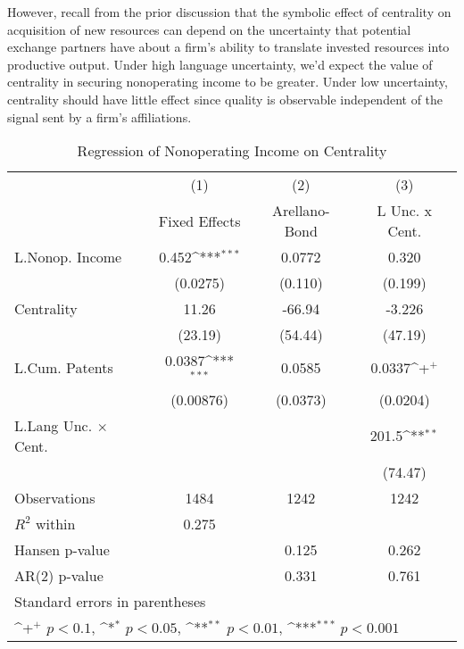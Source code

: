 However, recall from the prior discussion that the symbolic effect of centrality on acquisition of new resources can depend on the uncertainty that potential exchange partners have about a firm's ability to translate invested resources into productive output. Under high language uncertainty, we'd expect the value of centrality in securing nonoperating income to be greater. Under low uncertainty, centrality should have little effect since quality is observable independent of the signal sent by a firm's affiliations. 

\begin{table}[htbp]\centering \caption{Regression of Nonoperating Income on Centrality\label{r3}}
{
\def\sym#1{\ifmmode^{#1}\else\(^{#1}\)\fi}
\begin{tabular}{l*{3}{c}}
\hline\hline
                    &\multicolumn{1}{c}{(1)}&\multicolumn{1}{c}{(2)}&\multicolumn{1}{c}{(3)}\\
                    &\multicolumn{1}{c}{Fixed Effects}&\multicolumn{1}{c}{Arellano-Bond}&\multicolumn{1}{c}{L Unc. x Cent.}\\
\hline
L.Nonop. Income     &       0.452\sym{***}&      0.0772         &       0.320         \\
                    &    (0.0275)         &     (0.110)         &     (0.199)         \\
Centrality          &       11.26         &      -66.94         &      -3.226         \\
                    &     (23.19)         &     (54.44)         &     (47.19)         \\
L.Cum. Patents      &      0.0387\sym{***}&      0.0585         &      0.0337\sym{+}  \\
                    &   (0.00876)         &    (0.0373)         &    (0.0204)         \\
L.Lang Unc. $\times$ Cent.&                     &                     &       201.5\sym{**} \\
                    &                     &                     &     (74.47)         \\
\hline
Observations        &        1484         &        1242         &        1242         \\
$R^2$ within                &       0.275         &                     &                     \\
Hansen p-value             &                     &       0.125         &       0.262         \\
AR(2) p-value                &                     &       0.331         &       0.761         \\
\hline\hline
\multicolumn{4}{l}{\footnotesize Standard errors in parentheses}\\
\multicolumn{4}{l}{\footnotesize \sym{+} \(p<0.1\), \sym{*} \(p<0.05\), \sym{**} \(p<0.01\), \sym{***} \(p<0.001\)}\\
\end{tabular}
}
\end{table}

